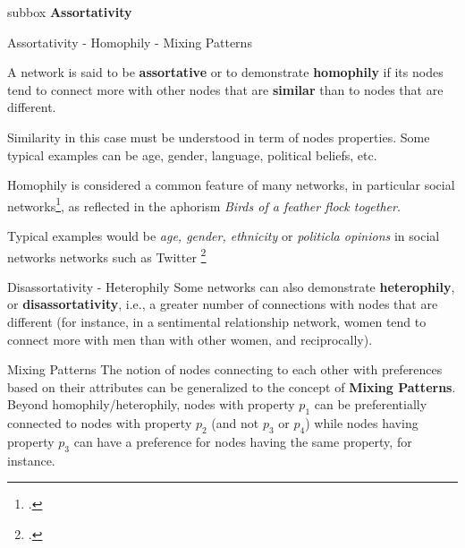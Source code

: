 \documentclass[a4paper,11pt]{book}
\begin{document}

\newpage



\begin{subbox}{subbox}{}
\centering
\Large{\textbf{Assortativity}}
\end{subbox}




\begin{textbox}{Assortativity - Homophily - Mixing Patterns}

A network is said to be \textbf{assortative} or to demonstrate \textbf{homophily} if its nodes tend to connect more with other nodes that are \textbf{similar} than to nodes that are different. 

Similarity in this case must be understood in term of nodes properties. Some typical examples can be age, gender, language, political beliefs, etc.

Homophily is considered a common feature of many networks, in particular social networks\footcite{mcpherson2001birds}, as reflected in the aphorism \textit{Birds of a feather flock together}.

Typical examples would be \textit{age, gender, ethnicity} or \textit{politicla opinions} in social networks networks such as Twitter \footcite{mcpherson2001birds}
\end{textbox}





\begin{textbox}{Disassortativity - Heterophily}
Some networks can also demonstrate \textbf{heterophily}, or \textbf{disassortativity}, i.e., a greater number of connections with nodes that are different (for instance, in a sentimental relationship network, women tend to connect more with men than with other women, and reciprocally).
\end{textbox}


\begin{textbox}{Mixing Patterns}
The notion of nodes connecting to each other with preferences based on their attributes can be generalized to the concept of \textbf{Mixing Patterns}. Beyond homophily/heterophily, nodes with property $p_1$ can be preferentially connected to nodes with property $p_2$ (and not $p_3$ or $p_4$) while nodes having property $p_3$ can have a preference for nodes having the same property, for instance.


\end{textbox}
\end{document}
